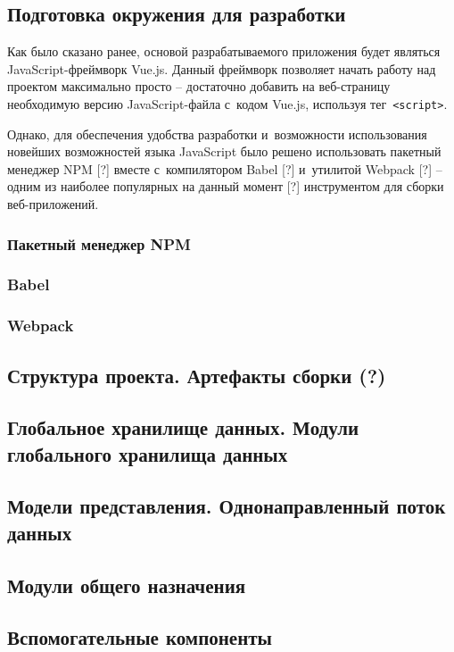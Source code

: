 
\subsection{Подготовка окружения для разработки}

Как было сказано ранее, основой разрабатываемого приложения будет являться JavaScript-фреймворк Vue.js. Данный фреймворк позволяет начать работу над проектом максимально просто -- достаточно добавить на веб-страницу необходимую версию JavaScript-файла с~кодом Vue.js, используя тег \,\verb|<script>|.

Однако, для обеспечения удобства разработки и~возможности использования новейших возможностей языка JavaScript было решено использовать пакетный менеджер NPM [?] вместе с~компилятором Babel [?] и~утилитой Webpack [?] -- одним из наиболее популярных на данный момент [?] инструментом для сборки веб-приложений.


\subsubsection{Пакетный менеджер NPM}


\subsubsection{Babel}


\subsubsection{Webpack}



\subsection{Структура проекта. Артефакты сборки (?)}

\subsection{Глобальное хранилище данных. Модули глобального хранилища данных}

\subsection{Модели представления. Однонаправленный поток данных}

\subsection{Модули общего назначения}

\subsection{Вспомогательные компоненты}

\newpage
